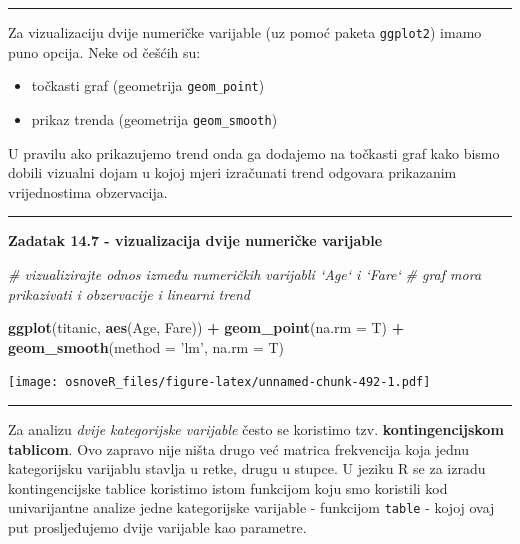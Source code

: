 \documentclass[]{book}
\newenvironment{Shaded}{\begin{snugshade}}{\end{snugshade}}
\newcommand{\KeywordTok}[1]{\textcolor[rgb]{0.13,0.29,0.53}{\textbf{#1}}}
\newcommand{\DataTypeTok}[1]{\textcolor[rgb]{0.13,0.29,0.53}{#1}}
\newcommand{\StringTok}[1]{\textcolor[rgb]{0.31,0.60,0.02}{#1}}
\newcommand{\CommentTok}[1]{\textcolor[rgb]{0.56,0.35,0.01}{\textit{#1}}}
\newcommand{\OperatorTok}[1]{\textcolor[rgb]{0.81,0.36,0.00}{\textbf{#1}}}
\newcommand{\NormalTok}[1]{#1}
\providecommand{\tightlist}{%
  \setlength{\itemsep}{0pt}\setlength{\parskip}{0pt}}
\theoremstyle{definition}
\theoremstyle{definition}
\theoremstyle{definition}
\theoremstyle{remark}
\begin{document}
\begin{center}\rule{0.5\linewidth}{\linethickness}\end{center}

Za vizualizaciju dvije numeričke varijable (uz pomoć paketa
\texttt{ggplot2}) imamo puno opcija. Neke od češćih su:

\begin{itemize}
\tightlist
\item
  točkasti graf (geometrija \texttt{geom\_point})
\item
  prikaz trenda (geometrija \texttt{geom\_smooth})
\end{itemize}

U pravilu ako prikazujemo trend onda ga dodajemo na točkasti graf kako
bismo dobili vizualni dojam u kojoj mjeri izračunati trend odgovara
prikazanim vrijednostima obzervacija.

\begin{center}\rule{0.5\linewidth}{\linethickness}\end{center}

\textbf{Zadatak 14.7 - vizualizacija dvije numeričke varijable}

\begin{Shaded}
\begin{Highlighting}[]
\CommentTok{# vizualizirajte odnos između numeričkih varijabli `Age` i `Fare`}
\CommentTok{# graf mora prikazivati i obzervacije i linearni trend}
\end{Highlighting}
\end{Shaded}

\begin{Shaded}
\begin{Highlighting}[]
\KeywordTok{ggplot}\NormalTok{(titanic, }\KeywordTok{aes}\NormalTok{(Age, Fare)) }\OperatorTok{+}\StringTok{ }\KeywordTok{geom_point}\NormalTok{(}\DataTypeTok{na.rm =}\NormalTok{ T) }\OperatorTok{+}\StringTok{ }\KeywordTok{geom_smooth}\NormalTok{(}\DataTypeTok{method =} \StringTok{'lm'}\NormalTok{, }\DataTypeTok{na.rm =}\NormalTok{ T)}
\end{Highlighting}
\end{Shaded}

\texttt{[image: osnoveR\_files/figure-latex/unnamed-chunk-492-1.pdf]}

\begin{center}\rule{0.5\linewidth}{\linethickness}\end{center}

Za analizu \emph{dvije kategorijske varijable} često se koristimo tzv.
\textbf{kontingencijskom tablicom}. Ovo zapravo nije ništa drugo već
matrica frekvencija koja jednu kategorijsku varijablu stavlja u retke,
drugu u stupce. U jeziku R se za izradu kontingencijske tablice
koristimo istom funkcijom koju smo koristili kod univarijantne analize
jedne kategorijske varijable - funkcijom \texttt{table} - kojoj ovaj put
prosljeđujemo dvije varijable kao parametre.
\end{document}
